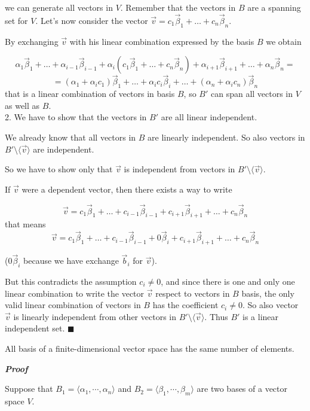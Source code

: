 we can generate all vectors in $V$. Remember that the vectors in $B$ are a spanning set for $V$. Let's now consider the vector $\vec v = c_1 \vec \beta_1 + \dots + c_n \vec \beta_n$.

By exchanging $\vec v$ with his linear combination expressed by the basis $B$ we obtain

$$
\alpha_1 \vec \beta_1 + \dots + \alpha_{i-1} \vec \beta_{i-1} + \alpha_i (c_1 \vec \beta_1 + \dots + c_n \vec \beta_n) + \alpha_{i+1} \vec \beta_{i+1} + \dots + \alpha_n \vec \beta_n =
$$
$$
= (\alpha_1 + \alpha_i c_1) \vec \beta_1 + \dots + \alpha_i c_i \vec \beta_i + \dots + (\alpha_n + \alpha_i c_n) \vec \beta_n
$$
that is a linear combination of vectors in basis $B$, so $B'$ can span all vectors in $V$ as well as $B$.
\\

2. We have to show that the vectors in $B'$ are all linear independent.

We already know that all vectors in $B$ are linearly independent. So also vectors in $B' \setminus \langle\vec v\rangle$ are independent.

So we have to show only that $\vec v$ is independent from vectors in $B' \setminus \langle\vec v\rangle$.

If $\vec v$ were a dependent vector, then there exists a way to write

$$
\vec v = c_1 \vec \beta_1 + \dots + c_{i-1} \vec \beta_{i-1} + c_{i+1} \vec \beta_{i+1} + \dots + c_n \vec \beta_n
$$
that means
$$
\vec v = c_1 \vec \beta_1 + \dots + c_{i-1} \vec \beta_{i-1} + 0 \vec \beta_i + c_{i+1} \vec \beta_{i+1} + \dots + c_n \vec \beta_n
$$

($0 \vec \beta_i$ because we have exchange $\vec b_i$ for $\vec v$).

But this contradicts the assumption $c_i \neq 0$, and since there is one and only one linear combination to write the vector $\vec v$ respect to vectors in $B$ basis, the only valid linear combination of vectors in $B$ has the coefficient $c_i \neq 0$. So also vector $\vec v$ is linearly
independent from other vectors in $B' \setminus \langle\vec v\rangle$. Thus $B'$ is a linear independent set. $\blacksquare$

\begin{theorem}
    All basis of a finite-dimensional vector space has the same number of elements.
\end{theorem}

\textbf{\textit{Proof}}

Suppose that $B_1=\langle \alpha_1, \cdots, \alpha_n \rangle$ and $B_2 = \langle \beta_1, \cdots, \beta_m \rangle$ are two bases of a vector space $V$.
\\

